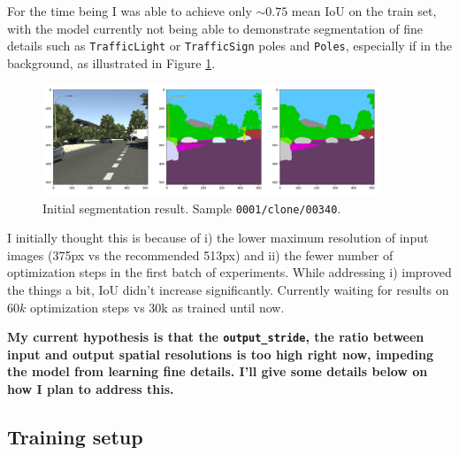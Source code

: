 \documentclass[10pt,a4paper]{article} %
\begin{document}
For the time being I was able to achieve only $\sim 0.75$ mean IoU on the
train set, with the model currently not being able to demonstrate
segmentation of fine details such as \texttt{TrafficLight} or
\texttt{TrafficSign} poles and \texttt{Poles}, especially if in the
background, as illustrated in Figure \ref{fig:coarse_details}.

\begin{figure}[h!]
   \centering
   \includegraphics[width=0.9\textwidth]{./graphics/coarse_details.png}
   \caption{Initial segmentation result. Sample \texttt{0001/clone/00340}.}
   \label{fig:coarse_details}
\end{figure}

I initially thought this is because of i) the lower maximum resolution of
input images (375px vs the recommended 513px) and ii) the fewer number of
optimization steps in the first batch of experiments. While addressing i)
improved the things a bit, IoU didn't increase significantly. Currently
waiting for results on $60k$ optimization steps vs 30k as trained until now.

\textbf{My current hypothesis is that the \texttt{output\_stride}, the ratio
between input and output spatial resolutions is too high right now, impeding
the model from learning fine details. I'll give some details below on how I
plan to address this.}

\subsection{Training setup}
\label{sub:training_setup}
\end{document}
